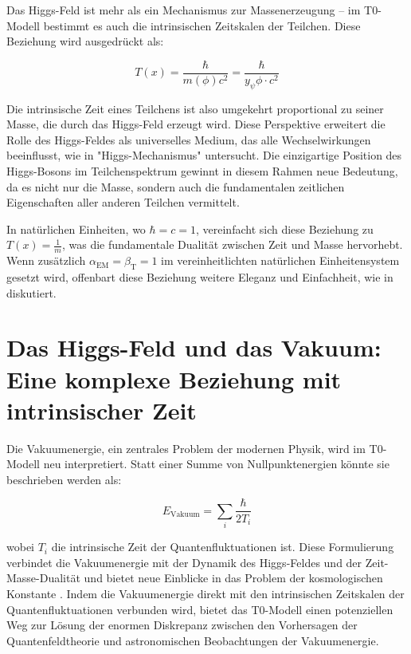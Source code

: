 \documentclass[a4paper,12pt]{article}
\newcommand{\Tfield}{T(x)}
\newcommand{\betaT}{\beta_{\text{T}}}
\newcommand{\alphaEM}{\alpha_{\text{EM}}}
\begin{document}
	Das Higgs-Feld ist mehr als ein Mechanismus zur Massenerzeugung – im T0-Modell bestimmt es auch die intrinsischen Zeitskalen der Teilchen. Diese Beziehung wird ausgedrückt als:
	
	\begin{equation}
		\Tfield = \frac{\hbar}{m(\phi) c^2} = \frac{\hbar}{y_\psi \phi \cdot c^2}
	\end{equation}
	
	Die intrinsische Zeit eines Teilchens ist also umgekehrt proportional zu seiner Masse, die durch das Higgs-Feld erzeugt wird. Diese Perspektive erweitert die Rolle des Higgs-Feldes als universelles Medium, das alle Wechselwirkungen beeinflusst, wie in "Higgs-Mechanismus" \cite{pascher_higgs_2025} untersucht. Die einzigartige Position des Higgs-Bosons im Teilchenspektrum gewinnt in diesem Rahmen neue Bedeutung, da es nicht nur die Masse, sondern auch die fundamentalen zeitlichen Eigenschaften aller anderen Teilchen vermittelt.
	
	In natürlichen Einheiten, wo \(\hbar = c = 1\), vereinfacht sich diese Beziehung zu \(\Tfield = \frac{1}{m}\), was die fundamentale Dualität zwischen Zeit und Masse hervorhebt. Wenn zusätzlich \(\alphaEM = \betaT = 1\) im vereinheitlichten natürlichen Einheitensystem gesetzt wird, offenbart diese Beziehung weitere Eleganz und Einfachheit, wie in \cite{pascher_alphabeta_2025} diskutiert.
	
	\section{Das Higgs-Feld und das Vakuum: Eine komplexe Beziehung mit intrinsischer Zeit}
	
	Die Vakuumenergie, ein zentrales Problem der modernen Physik, wird im T0-Modell neu interpretiert. Statt einer Summe von Nullpunktenergien könnte sie beschrieben werden als:
	
	\begin{equation}
		E_\text{Vakuum} = \sum_i \frac{\hbar}{2 T_i}
	\end{equation}
	
	wobei \(T_i\) die intrinsische Zeit der Quantenfluktuationen ist. Diese Formulierung verbindet die Vakuumenergie mit der Dynamik des Higgs-Feldes und der Zeit-Masse-Dualität und bietet neue Einblicke in das Problem der kosmologischen Konstante \cite{weinberg1989cosmological}. Indem die Vakuumenergie direkt mit den intrinsischen Zeitskalen der Quantenfluktuationen verbunden wird, bietet das T0-Modell einen potenziellen Weg zur Lösung der enormen Diskrepanz zwischen den Vorhersagen der Quantenfeldtheorie und astronomischen Beobachtungen der Vakuumenergie.
	
\end{document}
